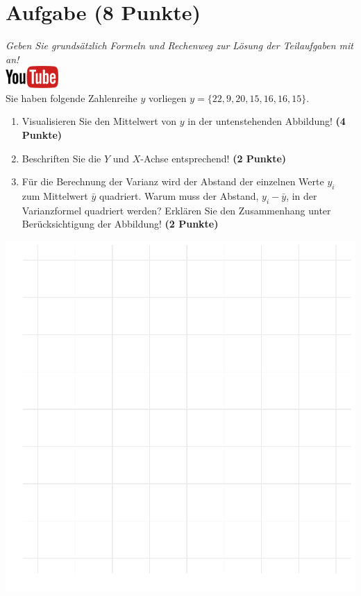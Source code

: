 \documentclass[a4paper, 9pt]{scrartcl}\usepackage[]{graphicx}\usepackage[]{xcolor}
\makeatletter
\def\maxwidth{ %
  \ifdim\Gin@nat@width>\linewidth
    \linewidth
  \else
    \Gin@nat@width
  \fi
}
\makeatother
\begin{document}
 
\clearpage

\section{Aufgabe \hfill (8 Punkte)}

\textit{Geben Sie grunds{\"a}tzlich Formeln und Rechenweg zur L{\"o}sung der
  Teilaufgaben mit an!} \\[1Ex]

\hfill\href{https://youtu.be/oMdtYbDInYE}{\includegraphics[width =
  2cm]{img/youtube}}\\[1Ex]

Sie haben folgende Zahlenreihe $y$ vorliegen
$y = \{22, 9, 20, 15, 16, 16, 15\}$.

\begin{enumerate}
\item Visualisieren Sie den Mittelwert von $y$ in der untenstehenden
  Abbildung! \textbf{(4 Punkte)}
\item Beschriften Sie die $Y$ und $X$-Achse entsprechend! \textbf{(2 Punkte)}
\item F{\"u}r die Berechnung der Varianz wird der Abstand der einzelnen Werte $y_i$
  zum Mittelwert $\bar{y}$ quadriert. Warum muss der Abstand, $y_i -
  \bar{y}$, in der Varianzformel quadriert werden?
  Erkl{\"a}ren Sie den Zusammenhang unter Ber{\"u}cksichtigung der Abbildung!
  \textbf{(2 Punkte)}  
\end{enumerate}



{\centering \includegraphics[width=\maxwidth]{img/desc-01-1} 

}
\end{document}
